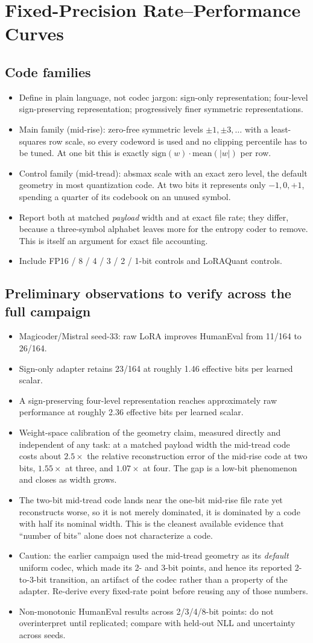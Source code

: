 \documentclass[10pt]{article}
\newcommand{\paperidea}[1]{\item #1}
\begin{document}
\section{Fixed-Precision Rate--Performance Curves}
\subsection{Code families}
\begin{itemize}
  \paperidea{Define in plain language, not codec jargon: sign-only representation; four-level sign-preserving representation; progressively finer symmetric representations.}
  \paperidea{Main family (mid-rise): zero-free symmetric levels $\pm1,\pm3,\dots$ with a least-squares row scale, so every codeword is used and no clipping percentile has to be tuned. At one bit this is exactly $\mathrm{sign}(w)\cdot\mathrm{mean}(|w|)$ per row.}
  \paperidea{Control family (mid-tread): absmax scale with an exact zero level, the default geometry in most quantization code. At two bits it represents only $-1,0,+1$, spending a quarter of its codebook on an unused symbol.}
  \paperidea{Report both at matched \emph{payload} width and at exact file rate; they differ, because a three-symbol alphabet leaves more for the entropy coder to remove. This is itself an argument for exact file accounting.}
  \paperidea{Include FP16 / 8 / 4 / 3 / 2 / 1-bit controls and LoRAQuant controls.}
\end{itemize}

\subsection{Preliminary observations to verify across the full campaign}
\begin{itemize}
  \paperidea{Magicoder/Mistral seed-33: raw LoRA improves HumanEval from 11/164 to 26/164.}
  \paperidea{Sign-only adapter retains 23/164 at roughly 1.46 effective bits per learned scalar.}
  \paperidea{A sign-preserving four-level representation reaches approximately raw performance at roughly 2.36 effective bits per learned scalar.}
  \paperidea{Weight-space calibration of the geometry claim, measured directly and independent of any task: at a matched payload width the mid-tread code costs about $2.5\times$ the relative reconstruction error of the mid-rise code at two bits, $1.55\times$ at three, and $1.07\times$ at four. The gap is a low-bit phenomenon and closes as width grows.}
  \paperidea{The two-bit mid-tread code lands near the one-bit mid-rise file rate yet reconstructs worse, so it is not merely dominated, it is dominated by a code with half its nominal width. This is the cleanest available evidence that ``number of bits'' alone does not characterize a code.}
  \paperidea{Caution: the earlier campaign used the mid-tread geometry as its \emph{default} uniform codec, which made its 2- and 3-bit points, and hence its reported 2-to-3-bit transition, an artifact of the codec rather than a property of the adapter. Re-derive every fixed-rate point before reusing any of those numbers.}
  \paperidea{Non-monotonic HumanEval results across 2/3/4/8-bit points: do not overinterpret until replicated; compare with held-out NLL and uncertainty across seeds.}
\end{itemize}
\end{document}
